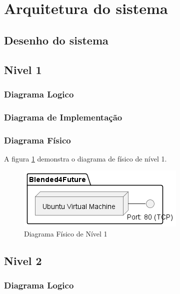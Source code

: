 \section{Arquitetura do sistema}


\subsection{Desenho do sistema}





\subsection{Nivel 1}

\subsubsection{Diagrama Logico}

\subsubsection{Diagrama de Implementação}

\subsubsection{Diagrama Físico} 

A figura \ref{fig:diagram-lvl1-physical} demonstra o diagrama de físico de nível 1.

\begin{figure}[h!tbp]
    \centering
    \includegraphics[width=0.5\linewidth]{capitulos/cap3-analisedoproblema/assets/arquiteturasistema/physical/physical_l1.png}
    \caption{Diagrama Físico de Nível 1}
    \label{fig:diagram-lvl1-physical}
\end{figure}





\subsection{Nivel 2}

\subsubsection{Diagrama Logico}

